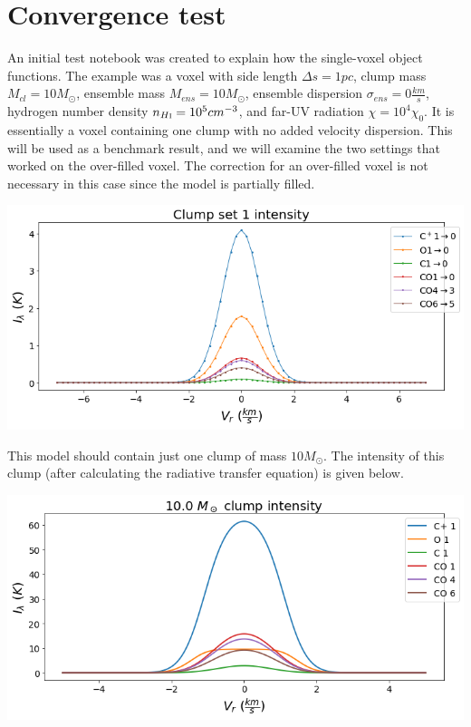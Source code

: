 \documentclass[a4paper]{article}
\newcommand{\mathsc}[1]{{\normalfont\textsc{#1}}}
\begin{document}
    \pagebreak

    \section{Convergence test}

    An initial test notebook was created to explain how the single-voxel object functions.
    The example was a voxel with side length \(\Delta s = 1 pc\), clump mass \(M_{cl} = 10 M_\odot\), ensemble mass \(M_{ens} = 10 M_\odot\), ensemble dispersion \(\sigma_{ens} = 0 \frac{km}{s}\), hydrogen number density \(n_{H\mathsc{i}} = 10^{5} cm^{-3}\), and far-UV radiation \(\chi = 10^{4} \chi_0\).
    It is essentially a voxel containing one clump with no added velocity dispersion.
    This will be used as a benchmark result, and we will examine the two settings that worked on the over-filled voxel.
    The correction for an over-filled voxel is not necessary in this case since the model is partially filled.

    \includegraphics*[width=\linewidth]{voxel_convergence_original.png}

    This model should contain just one clump of mass \(10 M_\odot\).
    The intensity of this clump (after calculating the radiative transfer equation) is given below.

    \includegraphics*[width=\linewidth]{voxel_single-clump.png}
\end{document}
